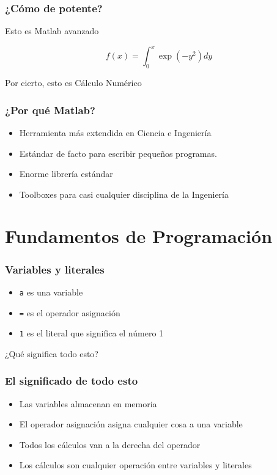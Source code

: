 \documentclass[12pt]{beamer}
\begin{document}
\begin{frame}
  \frametitle{¿Cómo de potente?}
Esto es Matlab avanzado

\[ f(x) = \int_0^x \exp(-y^2) dy \]

\testcode

Por cierto, esto es Cálculo Numérico
\end{frame}

\begin{frame}
  \frametitle{¿Por qué Matlab?}

  \begin{itemize}
  \item Herramienta más extendida en Ciencia e Ingeniería
  \item Estándar de facto para escribir pequeños programas.
  \item Enorme librería estándar
  \item Toolboxes para casi cualquier disciplina de la Ingeniería
  \end{itemize}

\end{frame}

\section{Fundamentos de Programación}

\begin{frame}
  \frametitle{Variables y literales}
\testcode
\begin{itemize}
\item \texttt{a} es una variable
\item \texttt{=} es el operador asignación
\item \texttt{1} es el literal que significa el número 1
\end{itemize}
\begin{center}
  ¿Qué significa todo esto?
\end{center}
\end{frame}

\begin{frame}
  \frametitle{El significado de todo esto}
  \begin{itemize}
  \item Las variables almacenan en memoria
  \item El operador asignación asigna cualquier cosa a una variable
  \item Todos los cálculos van a la derecha del operador
  \item Los cálculos son cualquier operación entre variables y literales
  \end{itemize}
\end{frame}
\end{document}
